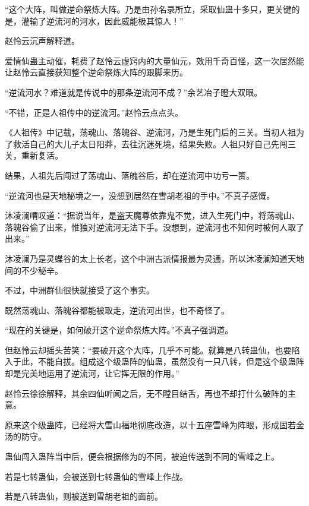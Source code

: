 
\begin{this_body}



“这个大阵，叫做逆命祭炼大阵。乃是由孙名录所立，采取仙蛊十多只，更关键的是，灌输了逆流河的河水，因此威能极其惊人！”

赵怜云沉声解释道。

爱情仙蛊主动催，耗费了赵怜云虚窍内的大量仙元，效用千奇百怪，这一次居然能让赵怜云直接获知整个逆命祭炼大阵的跟脚来历。

“逆流河水？难道就是传说中的那条逆流河不成？”余艺冶子瞪大双眼。

“不错，正是人祖传中的逆流河。”赵怜云点点头。

《人祖传》中记载，荡魂山、落魄谷、逆流河，乃是生死门后的三关。当初人祖为了救活自己的大儿子太日阳莽，去往沉迷死境，结果失败。人祖只好自己先闯三关，重新复活。

结果，人祖先后闯过了荡魂山、落魄谷后，却在逆流河中功亏一篑。

“逆流河也是天地秘境之一，没想到居然在雪胡老祖的手中。”不真子感慨。

沐凌澜喟叹道：“据说当年，是盗天魔尊依靠鬼不觉，进入生死门中，将荡魂山、落魄谷偷了出来，惟独对逆流河无法下手。没想到，逆流河也不知何时被何人取了出来。”

沐凌澜乃是灵蝶谷的太上长老，这个中洲古派情报最为灵通，所以沐凌澜知道天地间的不少秘辛。

不过，中洲群仙很快就接受了这个事实。

既然荡魂山、落魄谷都能被取走，逆流河出世，也不奇怪了。

“现在的关键是，如何破开这个逆命祭炼大阵。”不真子强调道。

但赵怜云却摇头苦笑：“要破开这个大阵，几乎不可能。就算是八转蛊仙，也要陷入于此，不能自拔。组成这个级蛊阵的仙蛊，虽然没有一只八转，但是这个级蛊阵却是完美地运用了逆流河，让它挥无限的作用。”

赵怜云徐徐解释，其余四仙听闻之后，无不瞠目结舌，再也不却打什么破阵的主意。

原来这个级蛊阵，已经将大雪山福地彻底改造，以十五座雪峰为阵眼，形成固若金汤的防守。

蛊仙闯入蛊阵当中后，便会根据修为的不同，被迫传送到不同的雪峰之上。

若是七转蛊仙，会被送到七转蛊仙的雪峰上作战。

若是八转蛊仙，则被送到雪胡老祖的面前。


\end{this_body}
